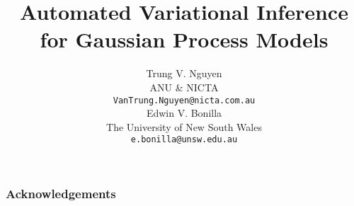 \documentclass{article} %
\title{Automated Variational Inference\\ for Gaussian Process Models}
\author{
Trung V. Nguyen \\
ANU \& NICTA\\
\texttt{VanTrung.Nguyen@nicta.com.au} \\
\And
Edwin V. Bonilla \\
The University of New South Wales \\
\texttt{e.bonilla@unsw.edu.au} \\
}
\begin{document}
\maketitle













\subsubsection*{Acknowledgements}


\small


\end{document}

